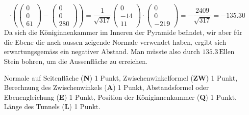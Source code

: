 \begin{loesung}
\begin{teilaufgaben}
\[\cdot
\left(
\begin{pmatrix}0\\0\\61\end{pmatrix}
-
\begin{pmatrix}0\\0\\280\end{pmatrix}
\right)
=
\frac1{\sqrt{317}}
\begin{pmatrix}0\\-14\\11 \end{pmatrix}
\cdot
\begin{pmatrix}0\\0\\-219\end{pmatrix}
=
-\frac{2409}{\sqrt{317}}=-135.30
\]
Da sich die Königinnenkammer im Inneren der Pyramide befindet, wir aber
für die Ebene die nach aussen zeigende Normale verwendet haben, ergibt
sich erwartungsgemäss ein negativer Abstand.
Man müsste also durch $135.3\,\text{Ellen}$ Stein bohren, um die Aussenfläche
zu erreichen.
\qedhere
\end{teilaufgaben}
\end{loesung}

\begin{bewertung}
Normale auf Seitenfläche ({\bf N}) 1 Punkt,
Zwischenwinkelformel ({\bf ZW}) 1 Punkt,
Berechnung des Zwischenwinkels ({\bf A}) 1 Punkt,
Abstandsformel oder Ebenengleichung ({\bf E}) 1 Punkt,
Position der Königinnenkammer ({\bf Q}) 1 Punkt,
Länge des Tunnels ({\bf L}) 1 Punkt.
\end{bewertung}

